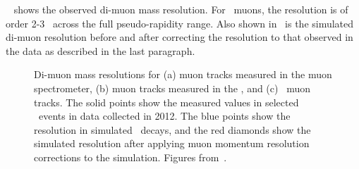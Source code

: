 
~ shows the observed di-muon mass resolution. For
\combined\ muons, the resolution is of order 2-3 \gev\ across the full
pseudo-rapidity range. Also shown in~ is the simulated
di-muon resolution before and after correcting the resolution to that observed
in the data as described in the last paragraph.

\begin{figure}[h]
\centering
    \caption[Di-muon mass resolutions for muon tracks in different detector
    subsystems.]{Di-muon mass resolutions for (a) muon tracks measured in the muon
    spectrometer, (b) muon tracks measured in the \id, and (c) \combined\
    muon tracks. The solid points show the measured values in selected \Zmm\ events
    in data collected in 2012. The blue points show the resolution in simulated
    \Zmm\ decays, and the red diamonds show the simulated resolution after applying
    muon momentum resolution corrections to the simulation. Figures
    from~\cite{MuonPerfPlots2012}.}
\label{fig:mu-resolution-dimu}
\end{figure}

